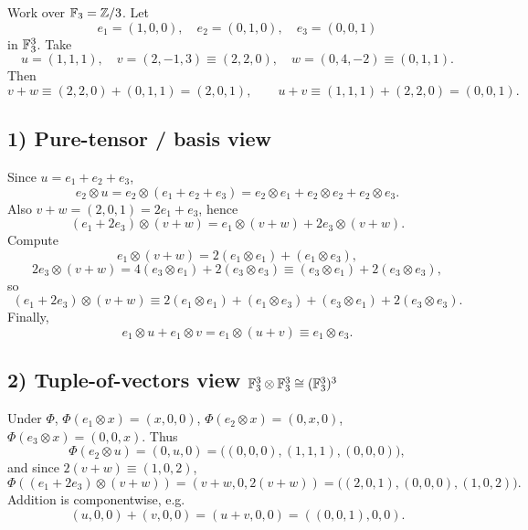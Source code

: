 \documentclass[12pt,a4paper]{article}
\theoremstyle{plain}
\theoremstyle{definition}      %
\begin{document}
Work over \(\Bbb F_3=\mathbb Z/3\). Let
\[
e_1=(1,0,0),\quad e_2=(0,1,0),\quad e_3=(0,0,1)
\]
in \(\Bbb F_3^3\). Take
\[
u=(1,1,1),\quad v=(2,-1,3)\equiv(2,2,0),\quad w=(0,4,-2)\equiv(0,1,1).
\]
Then
\[
v+w\equiv(2,2,0)+(0,1,1)=(2,0,1),\qquad
u+v\equiv(1,1,1)+(2,2,0)=(0,0,1).
\]

\subsection*{1) Pure-tensor / basis view}
Since \(u=e_1+e_2+e_3\),
\[
e_2\otimes u
= e_2\otimes(e_1+e_2+e_3)
= e_2\otimes e_1+e_2\otimes e_2+e_2\otimes e_3.
\]
Also \(v+w=(2,0,1)=2e_1+e_3\), hence
\[
(e_1+2e_3)\otimes(v+w)
= e_1\otimes(v+w)+2e_3\otimes(v+w).
\]
Compute
\[
e_1\otimes(v+w)=2(e_1\otimes e_1)+(e_1\otimes e_3),
\]
\[
2e_3\otimes(v+w)=4(e_3\otimes e_1)+2(e_3\otimes e_3)\equiv (e_3\otimes e_1)+2(e_3\otimes e_3),
\]
so
\[
(e_1+2e_3)\otimes(v+w)\equiv
2(e_1\otimes e_1)+(e_1\otimes e_3)+(e_3\otimes e_1)+2(e_3\otimes e_3).
\]
Finally,
\[
e_1\otimes u + e_1\otimes v = e_1\otimes(u+v)\equiv e_1\otimes e_3.
\]

\subsection*{2) Tuple-of-vectors view \(\Bbb F_3^3\otimes \Bbb F_3^3 \cong (\Bbb F_3^3)^3\)}
Under \(\Phi\), \(\Phi(e_1\otimes x)=(x,0,0)\), \(\Phi(e_2\otimes x)=(0,x,0)\), \(\Phi(e_3\otimes x)=(0,0,x)\).
Thus
\[
\Phi(e_2\otimes u)=(0,u,0)=\big((0,0,0),(1,1,1),(0,0,0)\big),
\]
and since \(2(v+w)\equiv(1,0,2)\),
\[
\Phi((e_1+2e_3)\otimes(v+w))
=(v+w,0,2(v+w))
=\big((2,0,1),(0,0,0),(1,0,2)\big).
\]
Addition is componentwise, e.g.
\[
(u,0,0)+(v,0,0)=(u+v,0,0)=((0,0,1),0,0).
\]
\end{document}
